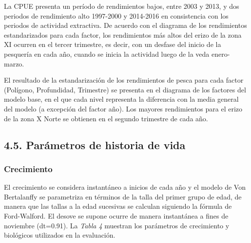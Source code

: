 \documentclass[
]{article}
\begin{document}
La CPUE presenta un período de rendimientos bajos, entre 2003 y 2013, y
dos periodos de rendimiento alto 1997-2000 y 2014-2016 en consistencia
con los periodos de actividad extractiva. De acuerdo con el diagrama de
los rendimientos estandarizados para cada factor, los rendimientos más
altos del erizo de la zona XI ocurren en el tercer trimestre, es decir,
con un desfase del inicio de la pesquería en cada año, cuando se inicia
la actividad luego de la veda enero-marzo.

El resultado de la estandarización de los rendimientos de pesca para
cada factor (Polígono, Profundidad, Trimestre) se presenta en el
diagrama de los factores del modelo base, en el que cada nivel
representa la diferencia con la media general del modelo (a excepción
del factor año). Los mayores rendimientos para el erizo de la zona X
Norte se obtienen en el segundo trimestre de cada año.

\hypertarget{paruxe1metros-de-historia-de-vida}{%
\subsection{4.5. Parámetros de historia de
vida}\label{paruxe1metros-de-historia-de-vida}}

\hypertarget{crecimiento}{%
\subsubsection{Crecimiento}\label{crecimiento}}

El crecimiento se considera instantáneo a inicios de cada año y el
modelo de Von Bertalanffy se parametriza en términos de la talla del
primer grupo de edad, de manera que las tallas a la edad sucesivas se
calculan siguiendo la fórmula de Ford-Walford. El desove se supone
ocurre de manera instantánea a fines de noviembre (dt=0.91). La
\emph{Tabla 4} muestran los parámetros de crecimiento y biológicos
utilizados en la evaluación.
\end{document}
